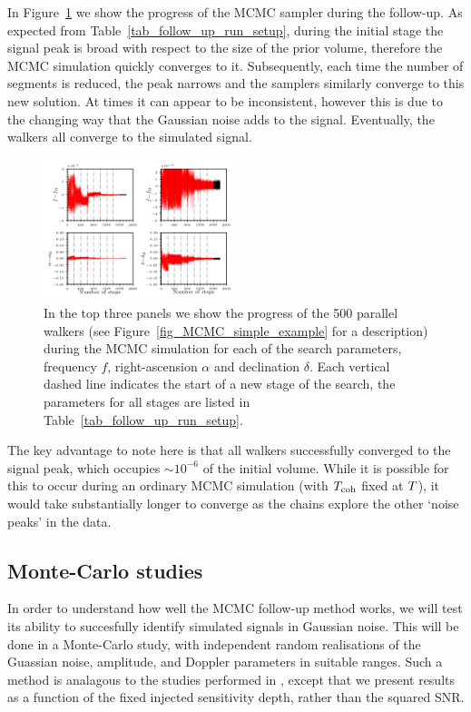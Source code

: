 \documentclass[aps, prd, twocolumn, superscriptaddress, floatfix, showpacs, nofootinbib, longbibliography]{revtex4-1}
\begin{document}
In Figure~\ref{fig_follow_up} we show the progress of the MCMC sampler during
the follow-up.  As expected from Table~\ref{tab_follow_up_run_setup}, during
the initial stage the signal peak is broad with respect to the size of the
prior volume, therefore the MCMC simulation quickly converges to it. Subsequently,
each time the number of segments is reduced, the peak narrows and the samplers
similarly converge to this new solution. At times it can appear to be inconsistent,
however this is due to the changing way that the Gaussian noise adds to the signal.
Eventually, the walkers all converge to the simulated signal.
\begin{figure}[htb]
\centering
\includegraphics[width=0.5\textwidth]{follow_up_walkers}
\caption{In the top three panels we show the progress of the 500 parallel
walkers (see Figure~\ref{fig_MCMC_simple_example} for a description) during the
MCMC simulation for each of the search parameters, frequency $f$,
right-ascension $\alpha$ and declination $\delta$. Each vertical dashed line indicates the start of a new stage of the search, the parameters for all stages
are listed in Table~\ref{tab_follow_up_run_setup}.}
\label{fig_follow_up}
\end{figure}

The key advantage to note here is that all walkers successfully converged to the
signal peak, which occupies $\sim 10^{-6}$ of the initial volume. While it is
possible for this to occur during an ordinary MCMC simulation (with $T_{\rm coh}$
fixed at $T$), it would take substantially longer to converge as the
chains explore the other `noise peaks' in the data.

\subsection{Monte-Carlo studies}
\label{sec_MCS_zoom}

In order to understand how well the MCMC follow-up method works, we will test
its ability to succesfully identify simulated signals in Gaussian noise. This will be
done in a Monte-Carlo study, with independent random realisations of the
Guassian noise, amplitude, and Doppler parameters in suitable ranges. Such a
method is analagous to the studies performed in \citet{shaltev2013}, except
that we present results as a function of the fixed injected sensitivity depth,
rather than the squared SNR.
\end{document}
